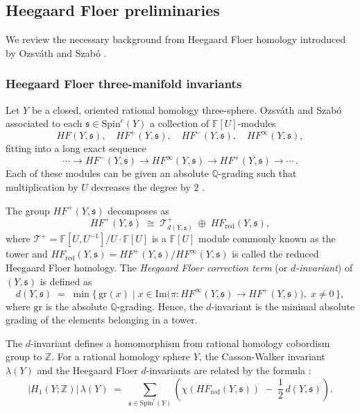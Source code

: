 \documentclass[12pt]{amsart}
\theoremstyle{definition}
\theoremstyle{definition}
\newcommand{\F}{{\mathbb{F}}}
\newcommand{\Z}{{\mathbb{Z}}}
\newcommand{\Spin}{\text{Spin}}
\newcommand{\HF}{HF}
\newcommand{\din}{d}
\begin{document}
\subsection{Heegaard Floer preliminaries}\label{hfprelim}


We review the necessary background from Heegaard Floer homology introduced by Ozsv\'ath and Szab\'o \cite{OSzAnnals,OSzProperties}. 

\subsubsection*{Heegaard Floer three-manifold invariants}

Let $Y$ be a closed, oriented rational homology three-sphere.
Ozsv\'ath and Szab\'o  associated to each $\mathfrak{s} \in {\Spin}^c(Y)$ a collection of $\F[U]$-modules
\[
\HF(Y,\mathfrak{s}),\quad
HF^+(Y,\mathfrak{s}),\quad
HF^-(Y,\mathfrak{s}),\quad
HF^\infty(Y,\mathfrak{s}),
\]
fitting into a long exact sequence
\[
\cdots \longrightarrow
\HF^-(Y,\mathfrak{s}) \longrightarrow
\HF^\infty(Y,\mathfrak{s}) \longrightarrow
\HF^+(Y,\mathfrak{s}) \longrightarrow \cdots\,.
\]
Each of these modules can  be given an absolute $\mathbb{Q}$-grading such that multiplication by $U$ decreases the degree by $2$ \cite{OSzAbsgraded}.

The group $HF^+(Y,\mathfrak{s})$ decomposes as
\[
\HF^+(Y,\mathfrak{s}) \;\cong\; \mathcal{T}^+_{d(Y,\mathfrak{s})}
\;\oplus\; \HF_{\mathrm{red}}(Y,\mathfrak{s}),
\]
where
$\mathcal{T}^+ = \mathbb{F}[U,U^{-1}]/U\cdot\mathbb{F}[U]$ is a $\F[U]$ module commonly known as the tower and $\HF_{\mathrm{red}}(Y,\mathfrak{s})= \HF^+(Y,\mathfrak{s})/\HF^\infty(Y,\mathfrak{s})$ is called the reduced Heegaard Floer homology. The \emph{Heegaard Floer correction term} (or \emph{$\din$-invariant}) of $(Y,\mathfrak{s})$ is defined as
\[
\din(Y,\mathfrak{s})
\;=\;
\min\!\bigl\{\, \mathrm{gr}(x) \;\big|\;
x \in \mathrm{Im}\bigl(\pi \colon HF^\infty(Y,\mathfrak{s}) \to HF^+(Y,\mathfrak{s})\bigr),\;
x \neq 0 \,\bigr\},
\]
where $\mathrm{gr}$ is the absolute $\mathbb{Q}$-grading. Hence, the $\din$-invariant is the minimal absolute grading of the elements belonging in a tower. 

The $\din$-invariant defines a homomorphism from rational homology cobordism group to $\Z$. For a rational homology sphere $Y$, the Casson-Walker invariant $\lambda(Y)$ and the Heegaard Floer $\din$-invariants are related by the formula \cite{OSzAbsgraded}:
\begin{equation*}
|H_1(Y;\mathbb{Z})|\,\lambda(Y) \;=\;
\sum_{\mathfrak{s} \in {\Spin}^c(Y)}
\!\left(\chi\!\left(\HF_{\mathrm{red}}(Y,\mathfrak{s})\right)
\;-\; \frac{1}{2}\,\din(Y,\mathfrak{s})\right).
\end{equation*}
\end{document}
